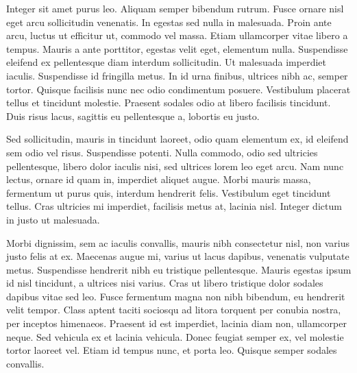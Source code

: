 Integer sit amet purus leo. Aliquam semper bibendum rutrum. Fusce ornare nisl eget arcu sollicitudin venenatis. In egestas sed nulla in malesuada. Proin ante arcu, luctus ut efficitur ut, commodo vel massa. Etiam ullamcorper vitae libero a tempus. Mauris a ante porttitor, egestas velit eget, elementum nulla. Suspendisse eleifend ex pellentesque diam interdum sollicitudin. Ut malesuada imperdiet iaculis. Suspendisse id fringilla metus. In id urna finibus, ultrices nibh ac, semper tortor. Quisque facilisis nunc nec odio condimentum posuere. Vestibulum placerat tellus et tincidunt molestie. Praesent sodales odio at libero facilisis tincidunt. Duis risus lacus, sagittis eu pellentesque a, lobortis eu justo.

Sed sollicitudin, mauris in tincidunt laoreet, odio quam elementum ex, id eleifend sem odio vel risus. Suspendisse potenti. Nulla commodo, odio sed ultricies pellentesque, libero dolor iaculis nisi, sed ultrices lorem leo eget arcu. Nam nunc lectus, ornare id quam in, imperdiet aliquet augue. Morbi mauris massa, fermentum ut purus quis, interdum hendrerit felis. Vestibulum eget tincidunt tellus. Cras ultricies mi imperdiet, facilisis metus at, lacinia nisl. Integer dictum in justo ut malesuada.

Morbi dignissim, sem ac iaculis convallis, mauris nibh consectetur nisl, non varius justo felis at ex. Maecenas augue mi, varius ut lacus dapibus, venenatis vulputate metus. Suspendisse hendrerit nibh eu tristique pellentesque. Mauris egestas ipsum id nisl tincidunt, a ultrices nisi varius. Cras ut libero tristique dolor sodales dapibus vitae sed leo. Fusce fermentum magna non nibh bibendum, eu hendrerit velit tempor. Class aptent taciti sociosqu ad litora torquent per conubia nostra, per inceptos himenaeos. Praesent id est imperdiet, lacinia diam non, ullamcorper neque. Sed vehicula ex et lacinia vehicula. Donec feugiat semper ex, vel molestie tortor laoreet vel. Etiam id tempus nunc, et porta leo. Quisque semper sodales convallis.